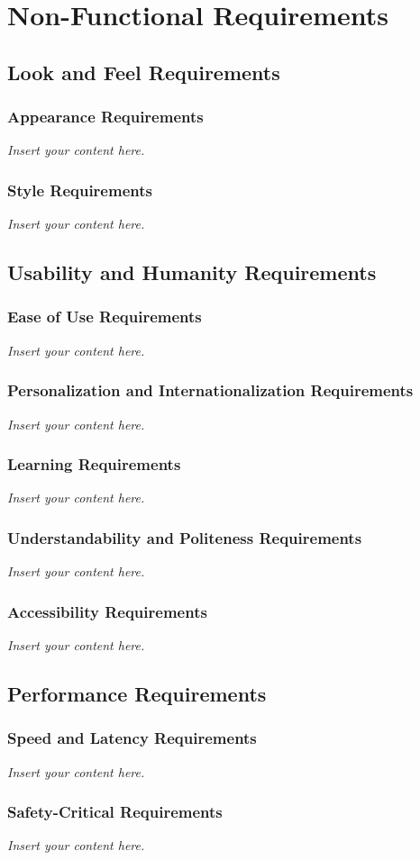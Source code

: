 \documentclass[12pt]{article}
\newcommand{\lips}{\textit{Insert your content here.}}
\begin{document}
\section{Non-Functional Requirements}
\subsection{Look and Feel Requirements}
\subsubsection{Appearance Requirements}
\lips
\subsubsection{Style Requirements}
\lips

\subsection{Usability and Humanity Requirements}
\subsubsection{Ease of Use Requirements}
\lips
\subsubsection{Personalization and Internationalization Requirements}
\lips
\subsubsection{Learning Requirements}
\lips
\subsubsection{Understandability and Politeness Requirements}
\lips
\subsubsection{Accessibility Requirements}
\lips

\subsection{Performance Requirements}
\subsubsection{Speed and Latency Requirements}
\lips
\subsubsection{Safety-Critical Requirements}
\lips
\end{document}
